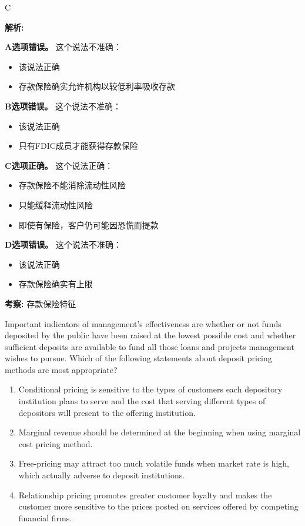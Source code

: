 \documentclass{article}
\newcounter{question} %
\newenvironment{explanation}
{\textbf{解析:}\par}
{\par}
\newcommand{\checklist}[1]{
    \textbf{考察:} #1 \par %
    \addcontentsline{toc}{subsection}{题号\thequestion 考察: #1} %
    \vspace{2em} %
}
\begin{document}
\begin{correctanswer}
    C
\end{correctanswer}

\begin{explanation}
    \textbf{A选项错误。}
    这个说法不准确：
    \begin{itemize}
        \item 该说法正确
        \item 存款保险确实允许机构以较低利率吸收存款
    \end{itemize}

    \textbf{B选项错误。}
    这个说法不准确：
    \begin{itemize}
        \item 该说法正确
        \item 只有FDIC成员才能获得存款保险
    \end{itemize}

    \textbf{C选项正确。}
    这个说法正确：
    \begin{itemize}
        \item 存款保险不能消除流动性风险
        \item 只能缓释流动性风险
        \item 即使有保险，客户仍可能因恐慌而提款
    \end{itemize}

    \textbf{D选项错误。}
    这个说法不准确：
    \begin{itemize}
        \item 该说法正确
        \item 存款保险确实有上限
    \end{itemize}
\end{explanation}

\checklist{存款保险特征}


\begin{question}
    Important indicators of management's effectiveness are whether or not funds deposited by the public have been raised at the lowest possible cost and whether sufficient deposits are available to fund all those loans and projects management wishes to pursue. Which of the following statements about deposit pricing methods are most appropriate?
    \begin{enumerate}
        \item Conditional pricing is sensitive to the types of customers each depository institution plans to serve and the cost that serving different types of depositors will present to the offering institution.
        \item Marginal revenue should be determined at the beginning when using marginal cost pricing method.
        \item Free-pricing may attract too much volatile funds when market rate is high, which actually adverse to deposit institutions.
        \item Relationship pricing promotes greater customer loyalty and makes the customer more sensitive to the prices posted on services offered by competing financial firms.
    \end{enumerate}
\end{question}
\end{document}
